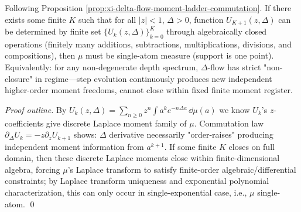\begin{proposition}\label{prop:xi-delta-flow-nonclosure}
Following Proposition \ref{prop:xi-delta-flow-moment-ladder-commutation}.
If there exists some finite \(K\) such that for all \(|z|<1\), \(\Delta>0\), function \(U_{K+1}(z,\Delta)\) can be determined by finite set \(\{U_k(z,\Delta)\}_{k=0}^{K}\) through algebraically closed operations (finitely many additions, subtractions, multiplications, divisions, and compositions),
then \(\mu\) must be single-atom measure (support is one point).
Equivalently: for any non-degenerate depth spectrum, \(\Delta\)-flow has strict "non-closure" in regime—step evolution continuously produces new independent higher-order moment freedoms, cannot close within fixed finite moment register.
\end{proposition}
\begin{proof}[Proof outline]
By
\(
U_k(z,\Delta)=\sum_{n\ge 0}z^n\int a^k e^{-n\Delta a}\,\dd\mu(a)
\)
we know \(U_k\)'s \(z\)-coefficients give discrete Laplace moment family of \(\mu\).
Commutation law \(\partial_\Delta U_k=-z\partial_z U_{k+1}\) shows: \(\Delta\) derivative necessarily "order-raises" producing independent moment information from \(a^{k+1}\).
If some finite \(K\) closes on full domain, then these discrete Laplace moments close within finite-dimensional algebra, forcing \(\mu\)'s Laplace transform to satisfy finite-order algebraic/differential constraints; by Laplace transform uniqueness and exponential polynomial characterization, this can only occur in single-exponential case, i.e., \(\mu\) single-atom. \qed
\end{proof}

